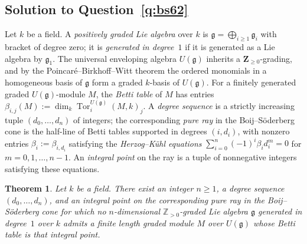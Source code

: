 \documentclass[11pt,reqno]{amsart}
\numberwithin{equation}{section}
\newtheorem{theorem}[thm]{Theorem}
\theoremstyle{definition}
\begin{document}
\subsection{Solution to Question~\ref{q:bs62}}\label{subsec:proof-bs62}

Let $k$ be a field. A \emph{positively graded Lie algebra} over $k$ is
$\mathfrak g=\bigoplus_{i\ge 1}\mathfrak g_i$ with bracket of degree
zero; it is \emph{generated in degree~$1$} if it is generated as a Lie
algebra by $\mathfrak g_1$. The universal enveloping algebra
$U(\mathfrak g)$ inherits a $\mathbf Z_{\ge 0}$-grading, and by the
Poincar\'e--Birkhoff--Witt theorem the ordered monomials in a
homogeneous basis of $\mathfrak g$ form a graded $k$-basis of
$U(\mathfrak g)$. For a finitely generated graded $U(\mathfrak g)$-module
$M$, the \emph{Betti table} of $M$ has entries
$\beta_{i,j}(M):=\dim_k\operatorname{Tor}_i^{U(\mathfrak g)}(M,k)_j$.
A \emph{degree sequence} is a strictly increasing tuple
$(d_0,\dots,d_n)$ of integers; the corresponding \emph{pure ray} in
the Boij--S\"oderberg cone is the half-line of Betti tables supported
in degrees $(i,d_i)$, with nonzero entries
$\beta_i:=\beta_{i,d_i}$ satisfying the \emph{Herzog--K\"uhl equations}
$\sum_{i=0}^n(-1)^i\beta_i d_i^m=0$ for $m=0,1,\dots,n-1$. An
\emph{integral point} on the ray is a tuple of nonnegative integers
satisfying these equations.

\begin{theorem}\label{thm:bs62}
Let $k$ be a field. There exist an integer $n\ge 1$, a degree sequence
$(d_0,\dots,d_n)$, and an integral point on the corresponding pure ray
in the Boij--S\"oderberg cone for which no $n$-dimensional
$\mathbb Z_{>0}$-graded Lie algebra $\mathfrak g$ generated in degree~$1$
over $k$ admits a finite length graded module $M$ over $U(\mathfrak g)$
whose Betti table is that integral point.
\end{theorem}
\end{document}
